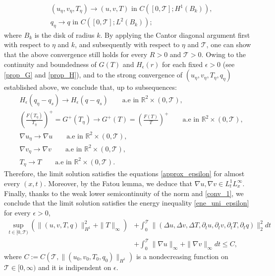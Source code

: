 \documentclass[11pt, a4paper, article,reqno,]{amsart}
\theoremstyle{remark}
\numberwithin{equation}{section}
\begin{document}
\begin{equation}\label{reg_sol_eta}
    \begin{aligned}
        &(u_{\eta},v_{\eta}, T_{\eta}) \rightarrow (u,v,T) \text{ in } C([0,\mathcal{T}];H^1(B_k)) , \\
        & q_{\eta} \rightarrow q \text{ in } C([0,\mathcal{T}];L^2(B_k));
    \end{aligned}
\end{equation}
where $B_k$ is the disk of radius $k$. By applying the Cantor diagonal argument first with respect to $\eta$ and $k$, and subsequently with respect to $\eta$ and $\mathcal{T}$, one can show that the above convergence still holds for every $R>0$ and $\mathcal{T}>0$. Owing to the continuity and boundedness of $G(T)$ and $H_\epsilon(r)$ for each fixed $\epsilon > 0$ (see \eqref{prop_G} and \eqref{prop_H}), and to the strong convergence of $(u_\eta, v_\eta, T_\eta, q_\eta)$ established above, we conclude that, up to subsequences:
\begin{equation*}
\begin{aligned}
    & H_\epsilon( q_\eta - q_s) \rightarrow H_\epsilon(q-q_s) \qquad \text{a.e in } \mathbb{R}^2 \times (0, \mathcal{T}), \\
    &  \left(\frac{F(T_\eta)}{T_\eta}\right)^+ = G^+(T_\eta) \rightarrow G^+(T)= \left(  \frac{F(T)}{T} \right)^+  \qquad \text{a.e in } \mathbb{R}^2 \times (0, \mathcal{T}), \\
    & \nabla u_\eta \rightarrow \nabla u \qquad \text{a.e in } \mathbb{R}^2 \times (0, \mathcal{T}),\\
    &\nabla v_\eta  \rightarrow \nabla v \qquad \text{a.e in } \mathbb{R}^2 \times (0, \mathcal{T}),\\
    &T_\eta \rightarrow T \qquad \text{a.e in } \mathbb{R}^2 \times (0, \mathcal{T}).
\end{aligned}
\end{equation*}
Therefore, the limit solution satisfies the equations \eqref{approx_epsilon} for almost every $(x,t)$. Moreover, by the Fatou lemma, we deduce that $\nabla u, \nabla v \in L^1_t L^\infty_x$. Finally, thanks to the weak lower semicontinuity of the norm and \eqref{conv_1}, we conclude that the limit solution satisfies the energy inequality \eqref{ene_uni_epsilon} for every $\epsilon > 0$,
\begin{equation*}
     \begin{aligned}
        \sup_{t \in [0,\mathcal{T})}\left( \|(u,v,T, q)\|_{H^1}^2 + \|T\|_\infty \right) & + \int_0^\mathcal{T} \|(\Delta u, \Delta v, \Delta T, \partial_t u, \partial_t v, \partial_t T, \partial_t q)\|_2^2 dt\\
        & + \int_0^\mathcal{T} \|\nabla u\|_{\infty} + \|\nabla v\|_{\infty}dt  \leq C,
    \end{aligned}
\end{equation*}
 where $C:= C(\mathcal{T}, \|(u_0,v_0,T_{0},q_0)\|_{H^1})$ is a nondecreasing function on $ \mathcal{T} \in [0,\infty)$ and it is indipendent on $\epsilon$.
\end{document}
